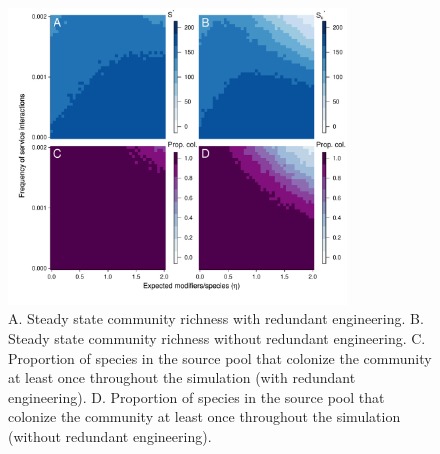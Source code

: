 \documentclass[twocolumn,preprintnumbers,amsmath,amssymb,superscriptaddress]{revtex4}
\begin{document}
\begin{figure}[h!]
\centering
\includegraphics[width=0.8\textwidth]{fig_steadystates2.pdf}
\caption{
A. Steady state community richness with redundant engineering.
B. Steady state community richness without redundant engineering.
C. Proportion of species in the source pool that colonize the community at least once throughout the simulation (with redundant engineering).
D. Proportion of species in the source pool that colonize the community at least once throughout the simulation (without redundant engineering).
}
\label{fig:steadystate}
\end{figure}
\end{document}
